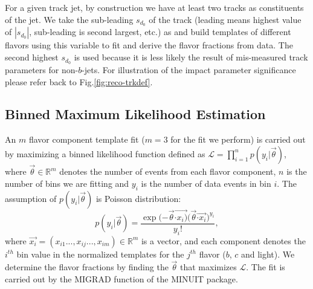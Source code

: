 For a given track jet, by construction we have at least two tracks as constituents of the jet. %
We take the sub-leading $s_{d_{0}}$ of the track (leading means highest value of $|s_{d_{0}}|$, sub-leading is second largest, etc.) as \subsdzero and build templates of different flavors using this variable to fit and derive the flavor fractions from data.   The second highest $s_{d_{0}}$ is used because it is less likely the result of mis-measured track parameters for non-$b$-jets. For illustration of the impact parameter significance please refer back to Fig.\ref{fig:reco-trkdef}.





\subsection{Binned Maximum Likelihood Estimation}

An $m$ flavor component template fit ($m = 3$ for the fit we perform) is carried out by maximizing a binned likelihood function defined as $\mathcal{L} = \prod _{i=1} ^n p(y_i| \vec{\theta})$, where $\vec{\theta} \in \mathbb{R}^m$ denotes the number of events from each flavor component, $n$ is the number of bins we are fitting and $y_i$ is the number of data events in bin $i$. The assumption of $p(y_i|\vec{\theta})$ is Poisson distribution: 
\begin{equation}
p(y_i|\vec{\theta}) = \frac{\exp{(-\vec{\theta} \vec{\cdot x_i)}} {(\vec{\theta}} \vec{\cdot x_i})^{y_i}}{y_i !}, 
\end{equation}
where $\vec{x_i}=(x_{i1}...,x_{ij}...,x_{im}) \in \mathbb{R}^m$ is a vector, and each component denotes the $i^{th}$ bin value in the normalized templates for the $j^{th}$ flavor ($b$, $c$ and light).   We determine the flavor fractions by finding the $\vec{\theta}$ that maximizes $\mathcal{L}$. The fit is carried out by the MIGRAD function of the MINUIT package. 

